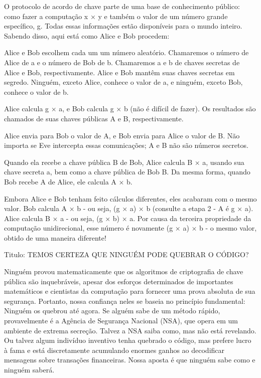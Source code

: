 \documentclass{book}
\begin{document}
O protocolo de acordo de chave parte de uma base de conhecimento público: como fazer a computação x × y e também o valor de um número grande específico, g. Todas essas informações estão disponíveis para o mundo inteiro. Sabendo disso, aqui está como Alice e Bob procedem:

Alice e Bob escolhem cada um um número aleatório. Chamaremos o número de Alice de a e o número de Bob de b. Chamaremos a e b de chaves secretas de Alice e Bob, respectivamente. Alice e Bob mantêm suas chaves secretas em segredo. Ninguém, exceto Alice, conhece o valor de a, e ninguém, exceto Bob, conhece o valor de b.

Alice calcula g × a, e Bob calcula g × b (não é difícil de fazer). Os resultados são chamados de suas chaves públicas A e B, respectivamente.

Alice envia para Bob o valor de A, e Bob envia para Alice o valor de B. Não importa se Eve intercepta essas comunicações; A e B não são números secretos.

Quando ela recebe a chave pública B de Bob, Alice calcula B × a, usando sua chave secreta a, bem como a chave pública de Bob B. Da mesma forma, quando Bob recebe A de Alice, ele calcula A × b.

Embora Alice e Bob tenham feito cálculos diferentes, eles acabaram com o mesmo valor. Bob calcula A × b - ou seja, (g × a) × b (consulte a etapa 2 - A é g × a). Alice calcula B × a - ou seja, (g × b) × a. Por causa da terceira propriedade da computação unidirecional, esse número é novamente (g × a) × b - o mesmo valor, obtido de uma maneira diferente!

Titulo: TEMOS CERTEZA QUE NINGUÉM PODE QUEBRAR O CÓDIGO?

Ninguém provou matematicamente que os algoritmos de criptografia de chave pública são inquebráveis, apesar dos esforços determinados de importantes matemáticos e cientistas da computação para fornecer uma prova absoluta de sua segurança. Portanto, nossa confiança neles se baseia no princípio fundamental: Ninguém os quebrou até agora. Se alguém sabe de um método rápido, provavelmente é a Agência de Segurança Nacional (NSA), que opera em um ambiente de extrema secreção. Talvez a NSA saiba como, mas não está revelando. Ou talvez algum indivíduo inventivo tenha quebrado o código, mas prefere lucro à fama e está discretamente acumulando enormes ganhos ao decodificar mensagens sobre transações financeiras. Nossa aposta é que ninguém sabe como e ninguém saberá.
\end{document}
